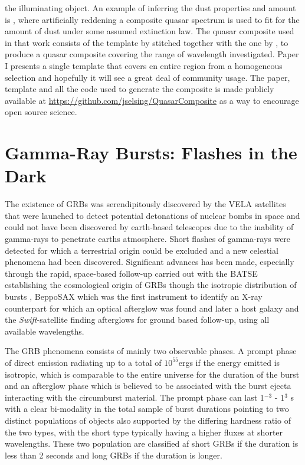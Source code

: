 the illuminating object. An example of inferring the dust properties and amount
is \citet{Krogager2015}, where artificially reddening a composite quasar
spectrum is used to fit for the amount of dust under some assumed extinction
law. The quasar composite used in that work consists of the template by
\citet{Vandenberk2001} stitched together with the one by \citet{Glikman2006}, to
produce a quasar composite covering the range of wavelength investigated. Paper
I presents a single template that covers en entire region from a homogeneous
selection and hopefully it will see a great deal of community usage. The paper,
template and all the code used to generate the composite is made publicly
available at \url{https://github.com/jselsing/QuasarComposite} as a way to
encourage open source science.

\section{Gamma-Ray Bursts: Flashes in the Dark}
\label{sec:intro:grb}


The existence of GRBs was serendipitously discovered by the VELA satellites that
were launched to detect potential detonations of nuclear bombs in space and
could not have been discovered by earth-based telescopes due to the inability of
gamma-rays to penetrate earths atmosphere. Short flashes of gamma-rays were
detected for which a terrestrial origin could be excluded and a new celestial
phenomena had been discovered. 
Significant advances has been made, especially through the rapid, space-based
follow-up carried out with the BATSE \citep{Harmon2004} establishing the
cosmological origin of GRBs though the isotropic distribution of bursts
\citep{Meegan1992},  BeppoSAX \citep{Boella1997} which was the first instrument
to identify an X-ray counterpart  \citep{Costa1997} for which an optical
afterglow was found and later a host galaxy and the \textit{Swift}-satellite
\citep{Gehrels2004} finding afterglows for ground based follow-up, using all
available wavelengths. 

The GRB phenomena consists of mainly two observable phases. A prompt phase of
direct emission radiating up to a total of $10^{55} $ergs if the energy emitted
is isotropic, which is comparable to the entire universe \citep{Kumar2014} for
the duration of the burst and an afterglow phase which is believed to be
associated with the burst ejecta interacting with the circumburst material. The
prompt phase can last 1$^{-3}$ - 1$^3$ s with a clear bi-modality in the total
sample of burst durations pointing to two distinct populations of objects also
supported by the differing hardness ratio of the two types, with the short type
typically having a higher fluxes at shorter wavelengths. These two population
are classified af short GRBs if the duration is less than 2 seconds and long
GRBs if the duration is longer. 


